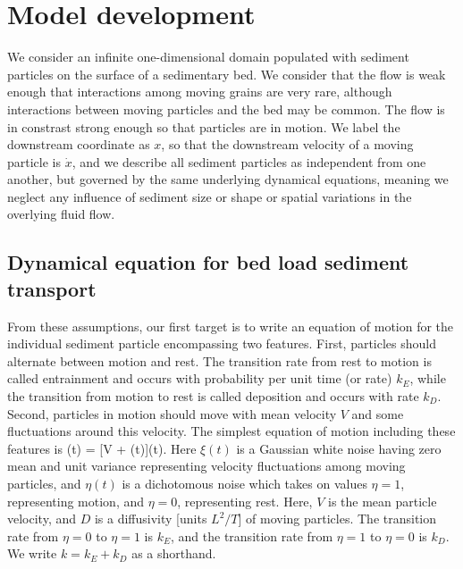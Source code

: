\section{Model development \label{sec:mod}}
We consider an infinite one-dimensional domain populated with sediment particles on the surface of a sedimentary bed. We consider that the flow is weak enough that interactions among moving grains are very rare, although interactions between moving particles and the bed may be common. The flow is in constrast strong enough so that particles are in motion. 
We label the downstream coordinate as $x$, so that the downstream velocity of a moving particle is $\dot{x}$, and we describe all sediment particles as independent from one another, but governed by the same underlying dynamical equations, meaning we neglect any influence of sediment size or shape or spatial variations in the overlying fluid flow.

\subsection{Dynamical equation for bed load sediment transport}
From these assumptions, our first target is to write an equation of motion for the individual sediment particle encompassing two features. First, particles should alternate between motion and rest. The transition rate from rest to motion is called entrainment and occurs with probability per unit time (or rate) $k_E$, while the transition from motion to rest is called deposition and occurs with rate $k_D$. Second, particles in motion should move with mean velocity $V$ and some fluctuations around this velocity. 
The simplest equation of motion including these features is
\be {}(t) = [V + \xi(t)]\eta(t).  \label{eq:langevin} \ee
Here $\xi(t)$ is a Gaussian white noise having zero mean and unit variance representing velocity fluctuations among moving particles, and $\eta(t)$ is a dichotomous noise which takes on values $\eta = 1$, representing motion, and $\eta=0$, representing rest. Here, $V$ is the mean particle velocity, and $D$ is a diffusivity [units $L^2/T$] of moving particles. The transition rate from $\eta=0$ to $\eta = 1$ is $k_E$, and the transition rate from $\eta=1$ to $\eta= 0$ is $k_D$. We write $k=k_E+k_D$ as a shorthand. 



